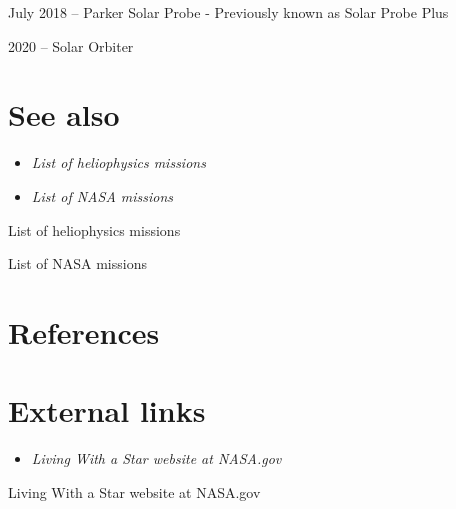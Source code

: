July 2018 -- Parker Solar Probe - Previously known as Solar Probe Plus

2020 -- Solar Orbiter

\section{See also}\label{see-also}

\begin{itemize}
\item
  \emph{List of heliophysics missions}
\item
  \emph{List of NASA missions}
\end{itemize}

List of heliophysics missions

List of NASA missions

\section{References}\label{references}

\section{External links}\label{external-links}

\begin{itemize}
\item
  \emph{Living With a Star website at NASA.gov}
\end{itemize}

Living With a Star website at NASA.gov
